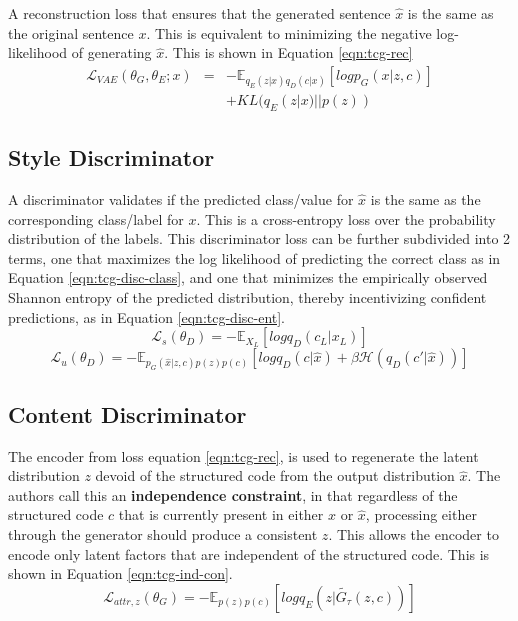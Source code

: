 A reconstruction loss that ensures that the generated sentence $\hat{x}$ is the same as the original sentence $x$. This is equivalent to minimizing the negative log-likelihood of generating $\hat{x}$. This is shown in Equation \ref{eqn:tcg-rec}
\begin{eqnarray} \label{eqn:tcg-rec}
	\mathcal{L}_{VAE}(\theta_G, \theta_E; x) &=& \nonumber
	- \mathbb{E}_{q_E(z|x)q_D(c|x)}[log p_G(x|z,c)] \\ & &
	+ KL(q_E(z|x)||p(z))
\end{eqnarray}


\subsection{Style Discriminator}

A discriminator validates if the predicted class/value for $\hat{x}$ is the same as the corresponding class/label for $x$. This is a cross-entropy loss over the probability distribution of the labels. This discriminator loss can be further subdivided into 2 terms, one that maximizes the log likelihood of predicting the correct class as in Equation \ref{eqn:tcg-disc-class}, and one that minimizes the empirically observed Shannon entropy of the predicted distribution, thereby incentivizing confident predictions, as in Equation \ref{eqn:tcg-disc-ent}.
\begin{equation} \label{eqn:tcg-disc-class}
	\mathcal{L}_s(\theta_D) = - \mathbb{E}_{X_L}[log q_D(c_L|x_L)]
\end{equation}
\begin{equation} \label{eqn:tcg-disc-ent}
	\mathcal{L}_u(\theta_D) = - \mathbb{E}_{p_G(\hat{x}|z,c)p(z)p(c)}
	[log q_D(c|\hat{x}) + \beta \mathcal{H}(q_D(c'|\hat{x}))]
\end{equation}


\subsection{Content Discriminator}

The encoder from loss equation \ref{eqn:tcg-rec}, is used to regenerate the latent distribution $z$ devoid of the structured code from the output distribution $\hat{x}$. The authors call this an \textbf{independence constraint}, in that regardless of the structured code $c$ that is currently present in either $x$ or $\hat{x}$, processing either through the generator should produce a consistent $z$. This allows the encoder to encode only latent factors that are independent of the structured code. This is shown in Equation \ref{eqn:tcg-ind-con}.
\begin{equation} \label{eqn:tcg-ind-con}
	\mathcal{L}_{attr, z}(\theta_G) = - \mathbb{E}_{p(z)p(c)}
	[log q_E(z|\tilde{G_{\tau}}(z,c))]
\end{equation}


